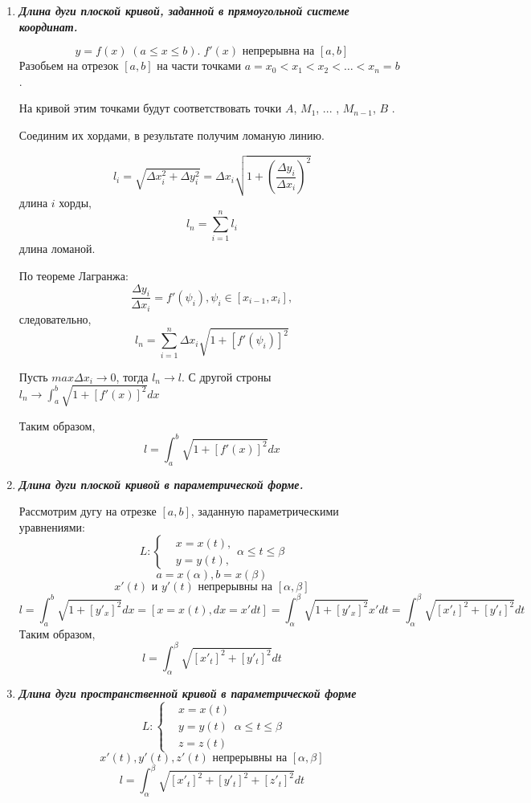\documentclass[a4paper,12pt]{article}
\theoremstyle{plain} %
\theoremstyle{definition} %
\theoremstyle{remark} %
\begin{document}
\begin{enumerate}
	\item \textit{\textbf{Длина дуги плоской кривой, заданной в прямоугольной системе координат.}}

	      \[ y = f(x) \; (a \leq x \leq b). \; f'(x) \text{ непрерывна на } [a, b] \]
	      Разобьем на отрезок $[a, b]$ на части точками $a = x_0 < x_1 < x_2 < \dots < x_n = b$ .

	      На кривой этим точками будут соответствовать точки $A$, $M_1$, ... ,  $M_{n-1}$, $B$ .

	      Соединим их хордами, в результате получим ломаную линию.

	      \[ l_i = \sqrt{ \Delta x_i^2 + \Delta y_i^2 } = \Delta x_i \sqrt{1 + \left( \frac{\Delta y_i}{\Delta x_i} \right)^2 }  \]
	      длина $i$ хорды,
	      \[ l_n = \sum_{i=1}^n l_i \]
	      длина ломаной.

	      По теореме Лагранжа: \[ \frac{\Delta y_i}{ \Delta x_i} = f'(\psi_i), \psi_i \in [x_{i-1}, x_i], \] следовательно, \[ l_n = \sum_{i=1}^n \Delta x_i \sqrt{1 + [f'(\psi_i)]^2} \]

	      Пусть $ max \Delta x_i \rightarrow 0 $, тогда $l_n \rightarrow l$. С другой строны $l_n \rightarrow \int_a^b \sqrt{1 + [f'(x)]^2} dx$

	      Таким образом,
	      \[ l = \int_a^b \sqrt{1 + [f'(x)]^2}dx \]

	\item \textit{\textbf{Длина дуги плоской кривой в параметрической форме.}}

	      Рассмотрим дугу на отрезке $[a, b]$, заданную параметрическими уравнениями:
	      \[
		      L: \begin{cases}
			       & x = x(t), \\
			       & y = y(t),
		      \end{cases}
		      \alpha \leq t \leq \beta
	      \]
	      \[ a = x(\alpha), b = x(\beta) \]
	      \[ x'(t) \text{ и } y'(t) \text{ непрерывны на } [\alpha, \beta] \]
	      \[ l = \int_a^b \sqrt{1 + [y'_x]^2} dx = [x = x(t), dx = x'dt] = \int_\alpha^\beta \sqrt{1 + [y'_x]^2} x'dt = \int_\alpha^\beta \sqrt{ [x'_t]^2 + [y'_t]^2} dt  \]
	      Таким образом,
	      \[ l = \int_\alpha^\beta \sqrt{[x'_t]^2 + [y'_t]^2} dt \]

	\item \textbf{\textit{Длина дуги пространственной кривой в параметрической форме}}
	      \[
		      L: \begin{cases}
			       & x = x(t) \\
			       & y = y(t) \\
			       & z = z(t)
		      \end{cases}
		      \alpha \leq t \leq \beta
	      \]
	      \[ x'(t), y'(t), z'(t) \text{ непрерывны на } [\alpha, \beta] \]
	      \[ l = \int_\alpha^\beta \sqrt{ [x'_t]^2 + [y'_t]^2 + [z'_t]^2 } dt \]


\end{enumerate}
\end{document}
